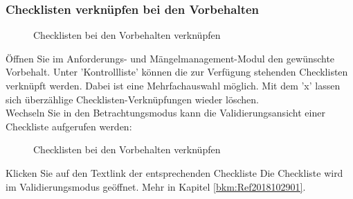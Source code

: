 \subsubsection{Checklisten verknüpfen bei den Vorbehalten}

\begin{figure}[H]
\caption{Checklisten bei den Vorbehalten verknüpfen}
\end{figure}

Öffnen Sie im Anforderungs- und Mängelmanagement-Modul den gewünschte Vorbehalt. Unter 'Kontrollliste'  können die zur Verfügung stehenden Checklisten verknüpft werden. Dabei ist eine Mehrfachauswahl möglich. Mit dem 'x'  lassen sich überzählige Checklisten-Verknüpfungen wieder löschen.\\
Wechseln Sie in den Betrachtungsmodus  kann die Validierungsansicht einer Checkliste aufgerufen werden:

\begin{figure}[H]
\caption{Checklisten bei den Vorbehalten verknüpfen}
\end{figure}

Klicken Sie auf den Textlink der entsprechenden Checkliste  Die Checkliste wird im Validierungsmodus geöffnet. Mehr in Kapitel \ref{bkm:Ref2018102901}.

